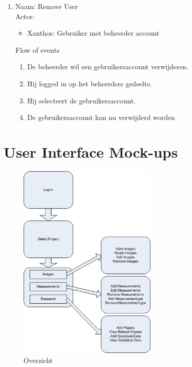 \begin{enumerate}
\item   Naam: Remove User  \\
	Actor:
	\begin{itemize}
		\item Xanthos: Gebruiker met beheerder account
	\end{itemize}
	Flow of events
	\begin{enumerate}
	  \item De beheerder wil een gebruikersaccount verwijderen.
		\item Hij logged in op het beheerders gedeelte.
		\item Hij selecteert de gebruikersaccount.
		\item De gebruikersaccount kan nu verwijderd worden
	\end{enumerate}
	

\end{enumerate}

\newpage

\section{User Interface Mock-ups}
\begin{figure}[htp]
\begin{center}
	\includegraphics[width=0.6\textwidth]{NewConcept}
\caption{Overzicht}
\label{default}
\end{center}
\end{figure}


